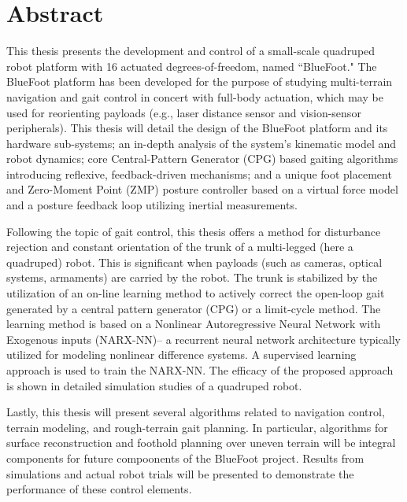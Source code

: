 \section*{Abstract}

	This thesis presents the development and control of a small-scale quadruped robot platform with 16 actuated degrees-of-freedom, named ``BlueFoot." The BlueFoot platform has been developed for the purpose of studying multi-terrain navigation and gait control in concert with full-body actuation, which may be used for reorienting payloads (e.g., laser distance sensor and vision-sensor peripherals). This thesis will detail the design of the BlueFoot platform and its hardware sub-systems; an in-depth analysis of the system's kinematic model and robot dynamics; core Central-Pattern Generator (CPG) based gaiting algorithms introducing reflexive, feedback-driven mechanisms; and a unique foot placement and Zero-Moment Point (ZMP) posture controller based on a virtual force model and a posture feedback loop utilizing inertial measurements. %

	Following the topic of gait control, this thesis offers a method for disturbance rejection and constant orientation of the trunk of a multi-legged (here a quadruped) robot. This is significant when payloads (such as cameras, optical systems, armaments) are carried by the robot.  The trunk is stabilized by the utilization of an on-line learning method to actively correct the open-loop gait generated by a central pattern generator (CPG) or a limit-cycle method. The learning method is based on a Nonlinear Autoregressive Neural Network with Exogenous inputs (NARX-NN)-- a recurrent neural network architecture typically utilized for modeling nonlinear difference systems. A supervised learning approach is used to train the NARX-NN. 
	The efficacy of the proposed approach is shown in detailed simulation studies of a quadruped robot. 

	Lastly, this thesis will present several algorithms related to navigation control, terrain modeling, and rough-terrain gait planning. In particular, algorithms for surface reconstruction and foothold planning over uneven terrain will be integral components for future compoonents of the BlueFoot project. Results from simulations and actual robot trials will be presented to demonstrate the performance of these control elements. 